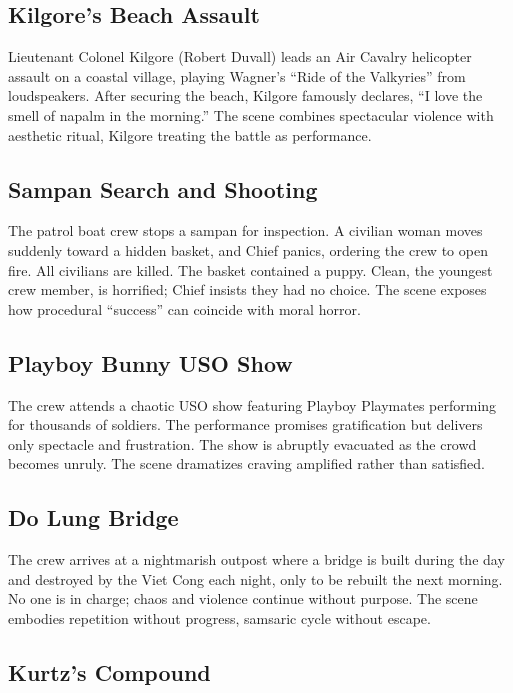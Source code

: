 \subsection*{Kilgore's Beach Assault}
\label{scene:kilgore-beach}

Lieutenant Colonel Kilgore (Robert Duvall) leads an Air Cavalry helicopter assault on a coastal
village, playing Wagner's ``Ride of the Valkyries'' from loudspeakers. After securing the
beach, Kilgore famously declares, ``I love the smell of napalm in the morning.'' The scene
combines spectacular violence with aesthetic ritual, Kilgore treating the battle as
performance.

\subsection*{Sampan Search and Shooting}
\label{scene:sampan}

The patrol boat crew stops a sampan for inspection. A civilian woman moves suddenly toward a
hidden basket, and Chief panics, ordering the crew to open fire. All civilians are killed. The
basket contained a puppy. Clean, the youngest crew member, is horrified; Chief insists they
had no choice. The scene exposes how procedural ``success'' can coincide with moral horror.

\subsection*{Playboy Bunny USO Show}
\label{scene:playboy-show}

The crew attends a chaotic USO show featuring Playboy Playmates performing for thousands of
soldiers. The performance promises gratification but delivers only spectacle and frustration.
The show is abruptly evacuated as the crowd becomes unruly. The scene dramatizes craving
amplified rather than satisfied.

\subsection*{Do Lung Bridge}
\label{scene:do-lung-bridge}

The crew arrives at a nightmarish outpost where a bridge is built during the day and destroyed
by the Viet Cong each night, only to be rebuilt the next morning. No one is in charge; chaos
and violence continue without purpose. The scene embodies repetition without progress, samsaric
cycle without escape.

\subsection*{Kurtz's Compound}
\label{scene:kurtz-compound}

